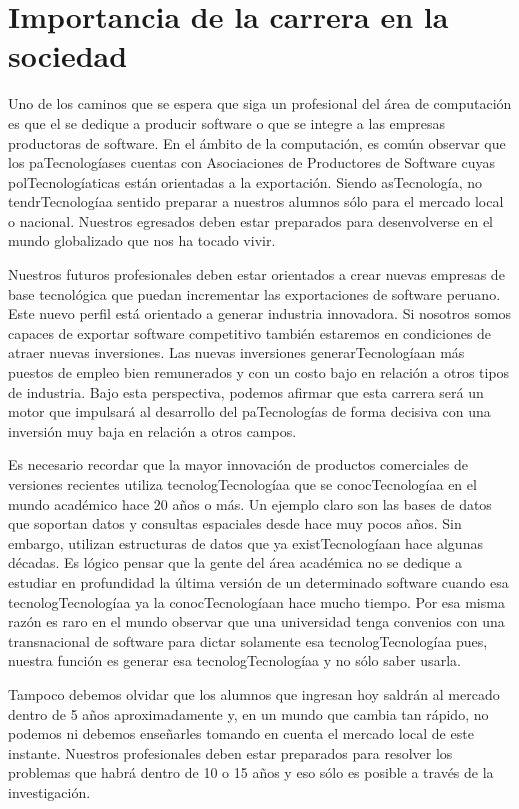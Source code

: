\section{Importancia de la carrera en la sociedad}\label{sec:cs-importancia-en-la-sociedad}
Uno de los caminos que se espera que siga un profesional del área de computación es que el se dedique a producir software o que se integre a las empresas productoras de software. En el ámbito de la computación, es común observar que los paTecnologíases cuentas con Asociaciones de Productores de Software cuyas polTecnologíaticas están orientadas a la exportación. Siendo asTecnología, no tendrTecnologíaa sentido preparar a nuestros alumnos sólo para el mercado local o nacional. Nuestros egresados deben estar preparados para desenvolverse en el mundo globalizado que nos ha tocado vivir.

Nuestros futuros profesionales deben estar orientados a crear nuevas empresas de base tecnológica que puedan incrementar las exportaciones de software peruano. Este nuevo perfil está orientado a generar industria innovadora. Si nosotros somos capaces de exportar software competitivo también estaremos en condiciones de atraer nuevas inversiones. Las nuevas inversiones generarTecnologíaan más puestos de empleo bien remunerados y con un costo bajo en relación a otros tipos de industria. Bajo esta perspectiva, podemos afirmar que esta carrera será un motor que impulsará al desarrollo del paTecnologías de forma decisiva con una inversión muy baja en relación a otros campos.

Es necesario recordar que la mayor innovación de productos comerciales de versiones recientes utiliza tecnologTecnologíaa que se conocTecnologíaa en el mundo académico hace 20 años o más. Un ejemplo claro son las bases de datos que soportan datos y consultas espaciales desde hace muy pocos años. Sin embargo, utilizan estructuras de datos que ya existTecnologíaan hace algunas décadas. Es lógico pensar que la gente del área académica no se dedique a estudiar en profundidad la última versión de un determinado software cuando esa tecnologTecnologíaa ya la conocTecnologíaan hace mucho tiempo. Por esa misma razón es raro en el mundo observar que una universidad tenga convenios con una transnacional de software para dictar solamente esa tecnologTecnologíaa pues, nuestra función es generar esa tecnologTecnologíaa y no sólo saber usarla.

Tampoco debemos olvidar que los alumnos que ingresan hoy saldrán al mercado dentro de 5 años aproximadamente y, en un mundo que cambia tan rápido, no podemos ni debemos enseñarles tomando en cuenta el mercado local de este instante. Nuestros profesionales deben estar preparados para resolver los problemas que habrá dentro de 10 o 15 años y eso sólo es posible a través de la investigación.
